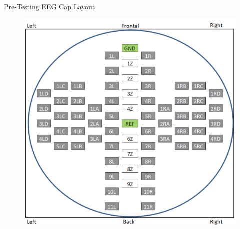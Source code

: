 \begin{frame}{Pre-Testing \textemdash{} EEG Cap Layout}
    \begin{figure}
        \includegraphics[width=.65\textwidth]{figures/results/CAP_Layout}
    \end{figure}
\end{frame}

% 
% 
